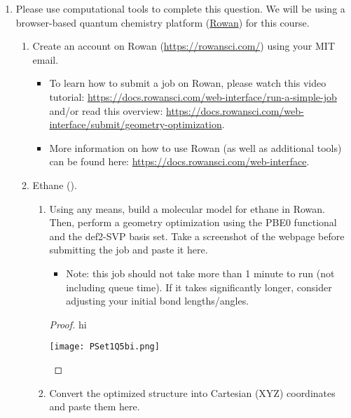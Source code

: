 \documentclass[../psets.tex]{subfiles}
\begin{document}
\begin{enumerate}
\begin{enumerate}
\begin{proof}
            As such, we can see that a thermal cycloreversion is forbidden/disfavored because it would involve creating a high-energy excited state of norbornadiene.
        \end{proof}
    \end{enumerate}
    \item Please use computational tools to complete this question. We will be using a browser-based quantum chemistry platform (\href{https://rowansci.com/}{Rowan}) for this course.
    \begin{enumerate}
        \item Create an account on Rowan (\url{https://rowansci.com/}) using your MIT email.
        \begin{itemize}
            \item To learn how to submit a job on Rowan, please watch this video tutorial: \url{https://docs.rowansci.com/web-interface/run-a-simple-job} and/or read this overview: \url{https://docs.rowansci.com/web-interface/submit/geometry-optimization}.
            \item More information on how to use Rowan (as well as additional tools) can be found here: \url{https://docs.rowansci.com/web-interface}.
        \end{itemize}
        \item Ethane ().
        \begin{enumerate}
            \item Using any means, build a molecular model for ethane in Rowan. Then, perform a geometry optimization using the PBE0 functional and the def2-SVP basis set. Take a screenshot of the webpage before submitting the job and paste it here.
            \begin{itemize}
                \item Note: this job should not take more than 1 minute to run (not including queue time). If it takes significantly longer, consider adjusting your initial bond lengths/angles.
            \end{itemize}
            \begin{proof}
                {\color{white}hi}
                \begin{center}
                    \texttt{[image: PSet1Q5bi.png]}
                \end{center}
            \end{proof}
            \item Convert the optimized structure into Cartesian (XYZ) coordinates and paste them here.

\end{enumerate}
\end{enumerate}
\end{enumerate}
\end{document}
